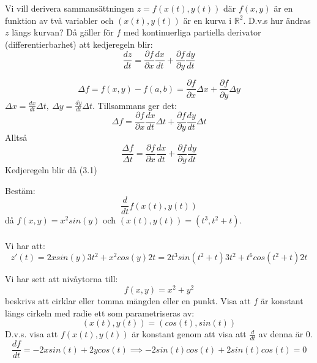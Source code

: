 \documentclass{report}
\begin{document}


{
Vi vill derivera sammansättningen $ z = f(x(t), y(t)) $ där $ f(x,y) $ är en funktion av två variabler och $ (x(t), y(t)) $ är en kurva i $ \mathbb{R}^2 $. D.v.s hur ändras $ z $ längs kurvan? Då gäller för $ f $ med kontinuerliga partiella derivator (differentierbarhet) att kedjeregeln blir:
\begin{equation*}
\frac{dz}{dt} = \frac{\partial f }{\partial x } \frac{dx}{dt} + \frac{\partial f }{\partial y } \frac{dy}{dt}
\end{equation*}

}

{
\begin{equation*}
\Delta f = f(x,y)-f(a,b) = \frac{\partial f }{\partial x } \Delta x + \frac{\partial f }{\partial y } \Delta y 
\end{equation*}
$ \Delta x = \frac{dx}{dt} \Delta t, \: \Delta y = \frac{dy}{dt} \Delta t $. Tillsammans ger det:
\begin{equation*}
\Delta f = \frac{\partial f }{\partial x } \frac{dx}{dt} \Delta t + \frac{\partial f }{\partial y } \frac{dy}{dt} \Delta t
\end{equation*}
Alltså
\begin{equation}
\frac{\Delta f}{\Delta t} = \frac{\partial f }{\partial x } \frac{dx}{dt} + \frac{\partial f }{\partial y } \frac{dy}{dt}
\end{equation}
Kedjeregeln blir då (3.1)
} 

\ex{}
{
Bestäm:
\begin{equation*}
\frac{d}{dt}f(x(t),y(t))
\end{equation*}
då $ f(x,y) = x^2sin(y) $ och $ (x(t), y(t)) = (t^3,t^2+t) $.\\\\

Vi har att:
\begin{equation*}
	z'(t) = 2xsin(y)3t^2+ x^2cos(y)2t = 2t^3sin(t^2+t)3t^2 + t^6cos(t^2+t)2t
\end{equation*}
}

\qs{}
{
Vi har sett att nivåytorna till:
\begin{equation*}
f(x,y) = x^2+y^2
\end{equation*}
beskrivs att cirklar eller tomma mängden eller en punkt. Visa att $ f $ är konstant längs cirkeln med radie ett som parametriseras av:
\begin{equation*}
(x(t), y(t)) = (cos(t), sin(t))
\end{equation*}
D.v.s. visa att $ f(x(t),y(t)) $ är konstant genom att visa att $ \frac{d}{dt} $ av denna är 0.
}
\sol 
\begin{equation*}
\frac{df}{dt} = -2xsin(t) + 2ycos(t) \implies -2sin(t)cos(t) + 2sin(t)cos(t) = 0
\end{equation*}
\end{document}
